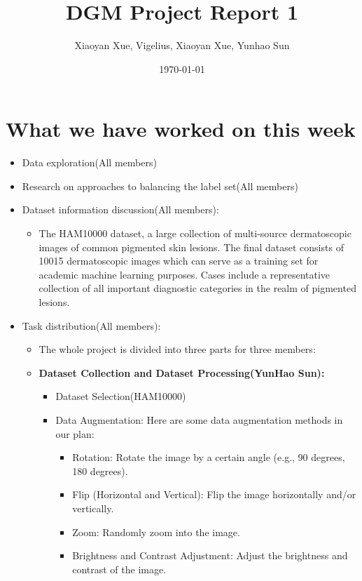 \documentclass[
ngerman,
accentcolor=9c,%
type=intern,
marginpar=false
]{tudapub}
\begin{document}
	\title{DGM Project Report 1}
	\author{Xiaoyan Xue, Vigelius, Xiaoyan Xue, Yunhao Sun}
	\date{\today}

	\maketitle
	\section{What we have worked on this week}
	\begin{itemize}
		\item Data exploration(All members)
		\item Research on approaches to balancing the label set(All members)
		\item Dataset information discussion(All members):
		\begin{itemize}
			\item The HAM10000 dataset, a large collection of multi-source dermatoscopic images of common pigmented skin lesions.  The final dataset consists of 10015 dermatoscopic images which can serve as a training set for academic machine learning purposes. Cases  include a representative collection of all important diagnostic categories in the realm of pigmented lesions.
		\end{itemize}
		\item Task distribution(All members):
		\begin{itemize}
			\item The whole project is divided into three parts for three members:
		\end{itemize}
		\begin{itemize}
			\item \textbf{Dataset Collection and Dataset Processing(YunHao Sun): }
			\begin{itemize}
				\item Dataset Selection(HAM10000)
				\item Data Augmentation:  Here are some data augmentation methods in our plan:
				\begin{itemize}
					\item Rotation: Rotate the image by a certain angle (e.g., 90 degrees, 180 degrees).
					\item Flip (Horizontal and Vertical): Flip the image horizontally and/or vertically.
					\item Zoom: Randomly zoom into the image.
					\item Brightness and Contrast Adjustment: Adjust the brightness and contrast of the image.

\end{itemize}
\end{itemize}
\end{itemize}
\end{itemize}
\end{document}

